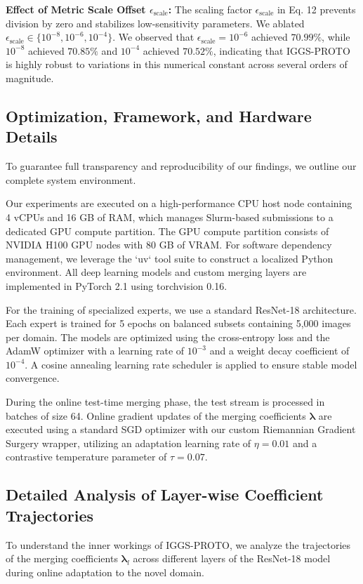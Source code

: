 \documentclass{article}
\theoremstyle{plain}
\theoremstyle{definition}
\theoremstyle{remark}
\begin{document}
\textbf{Effect of Metric Scale Offset $\epsilon_{\text{scale}}$:} The scaling factor $\epsilon_{\text{scale}}$ in Eq. 12 prevents division by zero and stabilizes low-sensitivity parameters. We ablated $\epsilon_{\text{scale}} \in \{10^{-8}, 10^{-6}, 10^{-4}\}$. We observed that $\epsilon_{\text{scale}} = 10^{-6}$ achieved $70.99\%$, while $10^{-8}$ achieved $70.85\%$ and $10^{-4}$ achieved $70.52\%$, indicating that IGGS-PROTO is highly robust to variations in this numerical constant across several orders of magnitude.

\subsection{Optimization, Framework, and Hardware Details}
To guarantee full transparency and reproducibility of our findings, we outline our complete system environment.

Our experiments are executed on a high-performance CPU host node containing 4 vCPUs and 16 GB of RAM, which manages Slurm-based submissions to a dedicated GPU compute partition. The GPU compute partition consists of NVIDIA H100 GPU nodes with 80 GB of VRAM. For software dependency management, we leverage the `uv` tool suite to construct a localized Python environment. All deep learning models and custom merging layers are implemented in PyTorch 2.1 using torchvision 0.16.

For the training of specialized experts, we use a standard ResNet-18 architecture. Each expert is trained for 5 epochs on balanced subsets containing 5,000 images per domain. The models are optimized using the cross-entropy loss and the AdamW optimizer with a learning rate of $10^{-3}$ and a weight decay coefficient of $10^{-4}$. A cosine annealing learning rate scheduler is applied to ensure stable model convergence. 

During the online test-time merging phase, the test stream is processed in batches of size 64. Online gradient updates of the merging coefficients $\boldsymbol{\lambda}$ are executed using a standard SGD optimizer with our custom Riemannian Gradient Surgery wrapper, utilizing an adaptation learning rate of $\eta = 0.01$ and a contrastive temperature parameter of $\tau = 0.07$.

\subsection{Detailed Analysis of Layer-wise Coefficient Trajectories}
To understand the inner workings of IGGS-PROTO, we analyze the trajectories of the merging coefficients $\boldsymbol{\lambda}_l$ across different layers of the ResNet-18 model during online adaptation to the novel domain.
\end{document}
